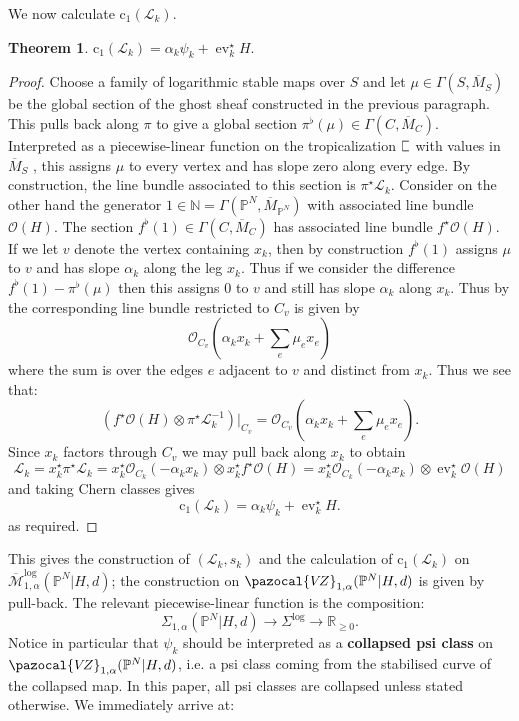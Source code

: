 \documentclass[11pt]{amsart}
\newcommand{\sqC}{\scalebox{0.8}[1.3]{$\sqsubset$}}
\newcommand{\MLog}{\overline{\mathcal{M}}^{\operatorname{log}}}
\newcommand{\PP}{\mathbb P}
\newcommand{\VZ}{\pazocal{V\!Z}}
\newcommand{\st}{\star}
\newcommand{\N}{\mathbb{N}}
\newcommand{\OO}{\mathcal{O}}
\renewcommand{\to}{\rightarrow}
\newcommand{\ev}{\operatorname{ev}}
\newcommand{\Lcal}{\mathcal{L}}
\newcommand{\cchern}{\mathrm{c}}
\newcommand{\ol}[1]{\overline{#1}}
\newcommand{\RR}{\mathbb{R}}
\theoremstyle{definition}
\newtheorem{thm}{Theorem}[section]
\theoremstyle{definition}
\begin{document}
We now calculate $\cchern_1(\Lcal_k)$. 
\begin{thm} $\cchern_1(\Lcal_k) = \alpha_k \psi_k + \ev_k^\st H.$\end{thm}
\begin{proof}
Choose a family of logarithmic stable maps over $S$ and let $\mu \in \Gamma(S,\ol{M}_S)$ be the global section of the ghost sheaf constructed in the previous paragraph. This pulls back along $\pi$ to give a global section $\pi^\flat(\mu) \in \Gamma(C,\ol{M}_C)$.  Interpreted as a piecewise-linear function on the tropicalization $\sqC$ with values in $\ol{M}_S$ \cite[Remark 7.3]{CavalieriChanUlirschWise}, this assigns $\mu$ to every vertex and has slope zero along every edge. By construction, the line bundle associated to this section is $\pi^\st \Lcal_k$. Consider on the other hand the generator $1 \in \N = \Gamma(\PP^N,\ol{M}_{\PP^N})$ with associated line bundle $\OO(H)$. The section $f^\flat(1) \in \Gamma(C,\ol{M}_C)$ has associated line bundle $f^\st\OO(H)$. If we let $v$ denote the vertex containing $x_k$, then by construction $f^\flat(1)$ assigns $\mu$ to $v$ and has slope $\alpha_k$ along the leg $x_k$. Thus if we consider the difference $f^\flat(1) - \pi^\flat(\mu)$ then this assigns $0$ to $v$ and still has slope $\alpha_k$ along $x_k$. Thus by \cite[Proposition 2.4.1]{RSPW} the corresponding line bundle restricted to $C_v$ is given by
\begin{equation*} \OO_{C_v} \left(\alpha_k x_k + \sum_e \mu_e x_e \right) \end{equation*}
where the sum is over the edges $e$ adjacent to $v$ and distinct from $x_k$. Thus we see that:
\begin{equation*} \left( f^\st\OO(H) \otimes \pi^\st \Lcal_k^{-1} \right) \big|_{C_v} = \OO_{C_v} \left(\alpha_k x_k + \sum_e \mu_e x_e \right).\end{equation*}
Since $x_k$ factors through $C_v$ we may pull back along $x_k$ to obtain
\begin{equation*} \Lcal_k = x_k^\st\pi^\st \Lcal_k = x_k^\st \OO_{C_k}(-\alpha_k x_k) \otimes x_k^\st f^\st\OO(H) = x_k^\st \OO_{C_k}(-\alpha_k x_k) \otimes \ev_k^\st \OO(H) \end{equation*}
and taking Chern classes gives
\begin{equation*} \cchern_1(\Lcal_k) = \alpha_k \psi_k + \ev_k^\st H.\end{equation*}
as required.\end{proof}
This gives the construction of $(\Lcal_k,s_k)$ and the calculation of $\cchern_1(\Lcal_k)$ on $\MLog_{1,\alpha}(\PP^N|H,d)$; the construction on $\VZ_{1,\alpha}(\PP^N|H,d)$ is given by pull-back. The relevant piecewise-linear function is the composition:
\begin{equation*} \Sigma_{1,\alpha}(\PP^N|H,d) \to \Sigma^{\log} \to \RR_{\geq 0}.\end{equation*}
Notice in particular that $\psi_k$ should be interpreted as a \textbf{collapsed psi class} on $\VZ_{1,\alpha}(\PP^N|H,d)$, i.e. a psi class coming from the stabilised curve of the collapsed map. In this paper, all psi classes are collapsed unless stated otherwise. We immediately arrive at:
\end{document}
